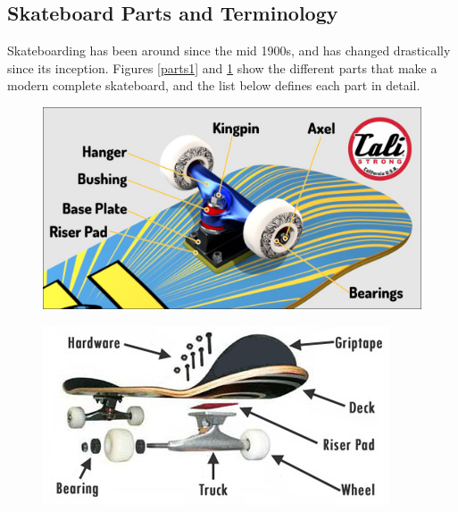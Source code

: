 \documentclass[titlepage, letterpaper,12pt]{article}
\begin{document}
\subsection{Skateboard Parts and Terminology}
Skateboarding has been around since the mid 1900s, and has changed drastically since its inception. Figures \ref{parts1} and \ref{parts2} show the different parts that make a modern complete skateboard, and the list below defines each part in detail.
\begin{figure}[!htbp]\centering
\begin{minipage}{.5\textwidth}\centering
\includegraphics[width=.8\textwidth]{parts1.jpg}
\label{parts1}
\end{minipage}%
\begin{minipage}{.5\textwidth}\centering
\includegraphics[width=.8\textwidth]{parts2.jpg}
\label{parts2}
\end{minipage}
\end{figure}
\end{document}
